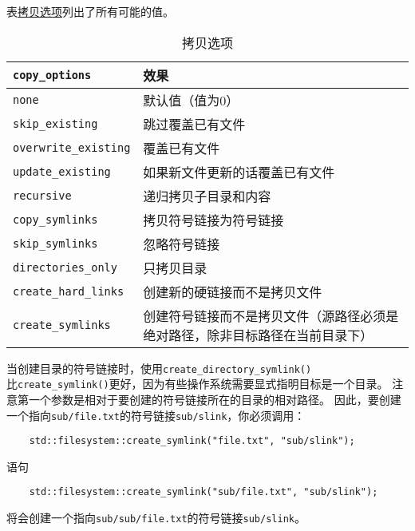 表\hyperref[t20.16]{拷贝选项}列出了所有可能的值。
\begin{table}[htb]
    \centering
    \begin{tabular}{l|p{}}
        \hline
        \texttt{copy\_options}       & \textbf{效果}                            \\
        \hline
        \texttt{none}                & 默认值（值为0）                               \\
        \texttt{skip\_existing}      & 跳过覆盖已有文件                               \\
        \texttt{overwrite\_existing} & 覆盖已有文件                                 \\
        \texttt{update\_existing}    & 如果新文件更新的话覆盖已有文件                        \\
        \texttt{recursive}           & 递归拷贝子目录和内容                             \\
        \texttt{copy\_symlinks}      & 拷贝符号链接为符号链接                            \\
        \texttt{skip\_symlinks}      & 忽略符号链接                                 \\
        \texttt{directories\_only}   & 只拷贝目录                                  \\
        \texttt{create\_hard\_links} & 创建新的硬链接而不是拷贝文件                         \\
        \texttt{create\_symlinks}    & 创建符号链接而不是拷贝文件（源路径必须是绝对路径，除非目标路径在当前目录下） \\
        \hline
    \end{tabular}
    \caption{拷贝选项}
    \label{t20.16}
\end{table}
当创建目录的符号链接时，使用\texttt{create\_directory\_symlink()}\\
比\texttt{create\_symlink()}更好，因为有些操作系统需要显式指明目标是一个目录。
注意第一个参数是相对于要创建的符号链接所在的目录的相对路径。
因此，要创建一个指向\texttt{sub/file.txt}的符号链接\texttt{sub/slink}，你必须调用：
\begin{lstlisting}
    std::filesystem::create_symlink("file.txt", "sub/slink");
\end{lstlisting}
语句
\begin{lstlisting}
    std::filesystem::create_symlink("sub/file.txt", "sub/slink");
\end{lstlisting}
将会创建一个指向\texttt{sub/sub/file.txt}的符号链接\texttt{sub/slink}。

